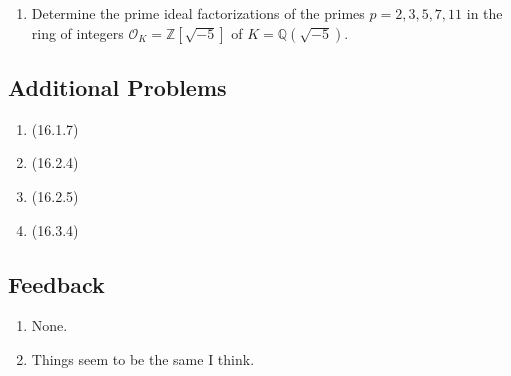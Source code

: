 \documentclass[11pt]{article}
\begin{document}
\begin{enumerate}
\begin{enumerate}
\begin{proof}
\begin{enumerate}
\begin{enumerate}
                    \item When $e\geq 2$, by the third isomorphism theorem and the fact that $P^e\subseteq P$ we have that \[\frac{p^2}{\abs{P/P^e}}=\frac{\abs{\mathcal{O}_K/P^e}}{\abs{P/P^e}} = \abs{\mathcal{O}_K/P}.\] As $P$ is a proper ideal we must have that $\abs{\mathcal{O}_K/P}$ is either $p^2$ or $p$, so  $\abs{P/P^e}$ is correspondingly either $1$ or $p$. In the case that  $\abs{P/P^e}=1$ we obtain case A (since $P\cong P^e$). So assume that $\abs{P/P^e}=p$ so that $\abs{\mathcal{O}_K/P}=2$. Then $P/P^e$ is a cyclic group of order $p$. Again use the third isomorphism theorem and note that $P^e\subseteq P^2$ to see that \[\frac{p}{\abs{P^2/P^e}} = \frac{\abs{P/P^e}}{\abs{P^2/P^e}} = \abs{P/P^2}.\] It follows that $\abs{P^2/P^e}$ is either $1$ or $p$, and in the latter case we again obtain case A (as $P\cong P^2$ implies $P\cong P^e$). So if $\abs{P^2/P^e}=1$, we obtain that $P^2\cong P^e$, which implies that $(p) = P^e = P^2$ with $\abs{\mathcal{O}_K/P}=2$, which is the third possibility in the problem statement.
                \end{enumerate}
                \item By reordering suppose that $\abs{\mathcal{O}_K/P_1^{e_1}}=\abs{\mathcal{O}_K/P_2^{e_2}}=p$ so that $\abs{\mathcal{O}_K/P_i^{e_i}}=1$ for $i\geq 3$. This means that in the factorization $(p) = \prod_i P_i^{e_i}$, we only have the terms $P_1^{e_1}$ and $P_2^{e_2}$ occur; that is, $(p)= P_1^{e_1}P_2^{e_2}$. For $i = 1,2$ we have $P_i^{e_i}\subseteq P_i$ so again we have \[\frac{p}{\abs{P_i/P_i^{e_i}}} = \frac{\abs{\mathcal{O}_K/P_i^{e_i}}}{\abs{P_i/P_i^{e_i}}}=\abs{\mathcal{O}_K/P_i},\] from which it similarly follows that $P_i\cong P_i^{e_i}$ so that $(p) = P_1P_2$ with $\abs{\mathcal{O}_K/P_1}=\abs{\mathcal{O}_K/P_2}=p$, the second possibility in the problem statement.
            \end{enumerate}
        \end{proof}
        \item Determine the prime ideal factorizations of the primes $p =2,3,5,7,11$ in the ring of integers $\mathcal{O}_K = \mathbb{Z}[\sqrt{-5}]$ of $K = \mathbb{Q}(\sqrt{-5})$.
        
        
    \end{enumerate}
\end{enumerate}
\subsection*{Additional Problems}
\begin{enumerate}
    \item (16.1.7)
    \item (16.2.4)
    \item (16.2.5)
    \item (16.3.4)
\end{enumerate}
\subsection*{Feedback}
\begin{enumerate}
    \item None.
    \item Things seem to be the same I think.
\end{enumerate}
\end{document}
